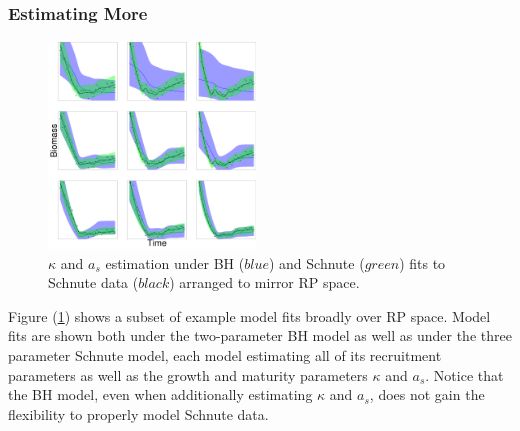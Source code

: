 

%
\subsubsection{Estimating More}

\begin{figure}
\includegraphics[width=0.49\textwidth]{../ddBias/indexGridKAExpT45N300A0-1AS10K0.1.png}
\caption{
$\kappa$ and $a_s$ estimation under BH ($blue$) and Schnute ($green$) fits to 
Schnute data ($black$) arranged to mirror RP space. %
}\label{estAK}
\end{figure}

%
Figure (\ref{estAK}) shows a subset of example model fits broadly over RP space. 
Model fits are shown both under the two-parameter BH model as well as under the 
three parameter Schnute model, each model estimating all of its recruitment 
parameters as well as the growth and maturity parameters $\kappa$ and $a_s$. 
Notice that the BH model, even when additionally estimating $\kappa$ and $a_s$, 
does not gain the flexibility to properly model Schnute data. 

